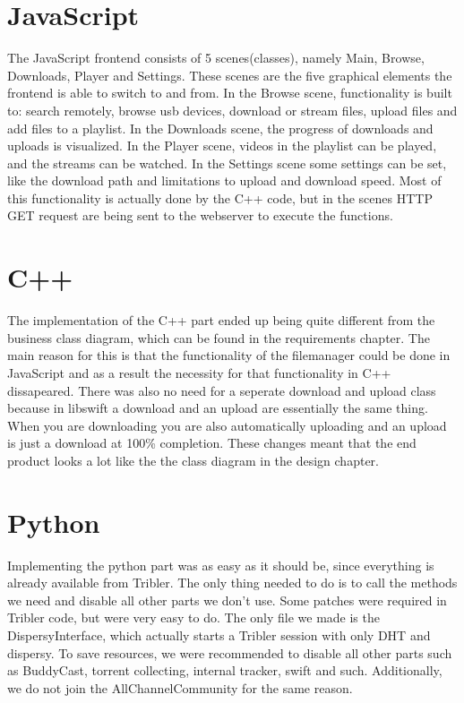 \section{JavaScript}
The JavaScript frontend consists of 5 scenes(classes), namely Main, Browse, Downloads, Player and Settings.
These scenes are the five graphical elements the frontend is able to switch to and from. In the Browse scene, functionality is built to: search remotely, browse usb devices, download or stream files, upload files and add files to a playlist. In the Downloads scene, the progress of downloads and uploads is visualized. In the Player scene, videos in the playlist can be played, and the streams can be watched. In the Settings scene some settings can be set, like the download path and limitations to upload and download speed. Most of this functionality is actually done by the C++ code, but in the scenes HTTP GET request are being sent to the webserver to execute the functions.

\section{C++}

The implementation of the C++ part ended up being quite different from the business class diagram, which can be found in the requirements chapter. The main reason for this is that the functionality of the filemanager could be done in JavaScript and as a result the necessity for that functionality in C++ dissapeared. There was also no need for a seperate download and upload class because in libswift a download and an upload are essentially the same thing. When you are downloading you are also automatically uploading and an upload is just a download at 100\% completion. These changes meant that the end product looks a lot like the the class diagram in the design chapter.

\section{Python}
Implementing the python part was as easy as it should be, since everything is already available from Tribler. The only thing needed to do is to call the methods we need and disable all other parts we don't use. Some patches were required in Tribler code, but were very easy to do.
The only file we made is the DispersyInterface, which actually starts a Tribler session with only DHT and dispersy. To save resources, we were recommended to disable all other parts such as BuddyCast, torrent collecting, internal tracker, swift and such. Additionally, we do not join the AllChannelCommunity for the same reason.

